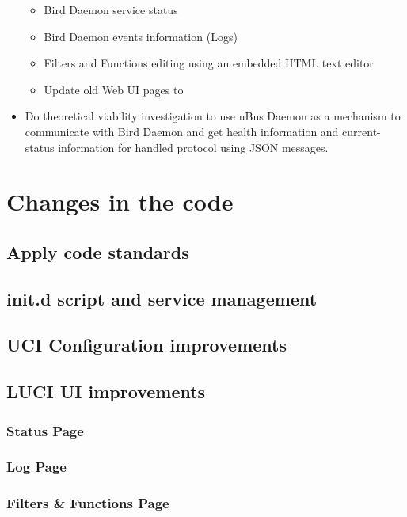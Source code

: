 \begin{itemize}
    \begin{itemize}
        \item Bird Daemon service status
        \item Bird Daemon events information (Logs)
        \item Filters and Functions editing using an embedded HTML text editor
        \item Update old Web UI pages to 
    \end{itemize}
    \item Do theoretical viability investigation to use uBus Daemon as a mechanism to communicate with Bird Daemon and get health information and current-status information for handled protocol using JSON messages.
\end{itemize}



\section{Changes in the code}

\subsection{Apply code standards}

\subsection{init.d script and service management}

\subsection{UCI Configuration improvements}

\subsection{LUCI UI improvements}

\subsubsection{Status Page}

\subsubsection{Log Page}

\subsubsection{Filters \& Functions Page}

